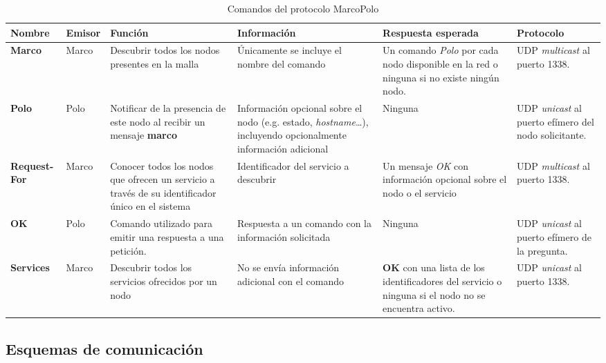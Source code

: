 \begin{landscape}
\begin{table}[H]
\begin{tabular}{|p{2.35cm}|p{1.2cm}|p{4.5cm}|p{5cm}|p{5cm}|p{3.5cm}|}
\hline
\textbf{Nombre} & \textbf{Emisor} & \textbf{Función} & \textbf{Información} & \textbf{Respuesta esperada} & \textbf{Protocolo}\\ \hline

\textbf{Marco} & Marco & Descubrir todos los nodos presentes en la malla & Únicamente se incluye el nombre del comando & Un comando \textit{Polo} por cada nodo disponible en la red o ninguna si no existe ningún nodo. & UDP \textit{multicast} al puerto 1338.\\ \hline

\textbf{Polo} & Polo & Notificar de la presencia de este nodo al recibir un mensaje \textbf{marco} & Información opcional sobre el nodo (e.g. estado, \textit{hostname}\dots), incluyendo opcionalmente información adicional  & Ninguna &  UDP \textit{unicast} al puerto efímero del nodo solicitante.\\ \hline

\textbf{Request-For} & Marco & Conocer todos los nodos que ofrecen un servicio a través de su identificador único en el sistema & Identificador del servicio a descubrir & Un mensaje \textit{OK} con información opcional sobre el nodo o el servicio & UDP \textit{multicast} al puerto 1338.\\ \hline

\textbf{OK} & Polo & Comando utilizado para emitir una respuesta a una petición. & Respuesta a un comando con la información solicitada & Ninguna & UDP \textit{unicast} al puerto efímero de la pregunta.\\ \hline

\textbf{Services} & Marco & Descubrir todos los servicios ofrecidos por un nodo & No se envía información adicional con el comando & \textbf{OK} con una lista de los identificadores del servicio o ninguna si el nodo no se encuentra activo. & UDP \textit{unicast} al puerto 1338.\\ \hline
\end{tabular}
\caption{Comandos del protocolo MarcoPolo}
\end{table}
\end{landscape}

\subsection{Esquemas de comunicación}

